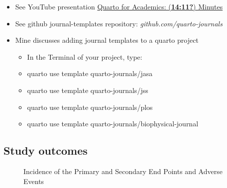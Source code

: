 \documentclass[
  letterpaper,
  DIV=11,
  numbers=noendperiod]{scrartcl}
\providecommand{\tightlist}{%
  \setlength{\itemsep}{0pt}\setlength{\parskip}{0pt}}\usepackage{longtable,booktabs,array}
\begin{document}
\begin{itemize}
\tightlist
\item
  See YouTube presentation
  \href{https://www.youtube.com/watch?v=EbAAmrB0luA&t=237s}{Quarto for
  Academics: (\textbf{14:11?}) Minutes}
\item
  See github journal-templates repository:
  \emph{github.com/quarto-journals}
\item
  Mine discusses adding journal templates to a quarto project

  \begin{itemize}
  \tightlist
  \item
    In the Terminal of your project, type:
  \item
    quarto use template quarto-journals/jasa\\
  \item
    quarto use template quarto-journals/jss\\
  \item
    quarto use template quarto-journals/plos\\
  \item
    quarto use template quarto-journals/biophysical-journal
  \end{itemize}
\end{itemize}

\subsection{Study outcomes}\label{study-outcomes}

\begin{figure}[H]


\caption{\label{fig-incidences-adverse-events}Incidence of the Primary
and Secondary End Points and Adverse Events}

\end{figure}%
\end{document}

